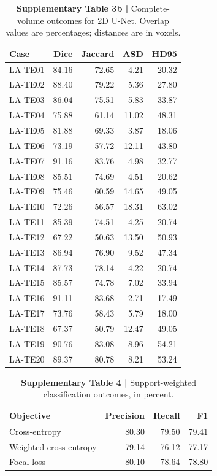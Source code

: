 \documentclass[11pt,a4paper]{article}
\begin{document}
\begin{table}[H]\centering\sffamily\footnotesize
\caption*{\textbf{Supplementary Table 3b | }Complete-volume outcomes for 2D U-Net. Overlap values are percentages; distances are in voxels.}
\setlength{\tabcolsep}{5pt}\renewcommand{\arraystretch}{1.18}
\begin{tabular}{lrrrr}
\toprule
Case & Dice & Jaccard & ASD & HD95 \\
\midrule
LA-TE01 & 84.16 & 72.65 & 4.21 & 20.32 \\
LA-TE02 & 88.40 & 79.22 & 5.36 & 27.80 \\
LA-TE03 & 86.04 & 75.51 & 5.83 & 33.87 \\
LA-TE04 & 75.88 & 61.14 & 11.02 & 48.31 \\
LA-TE05 & 81.88 & 69.33 & 3.87 & 18.06 \\
LA-TE06 & 73.19 & 57.72 & 12.11 & 43.80 \\
LA-TE07 & 91.16 & 83.76 & 4.98 & 32.77 \\
LA-TE08 & 85.51 & 74.69 & 4.51 & 20.62 \\
LA-TE09 & 75.46 & 60.59 & 14.65 & 49.05 \\
LA-TE10 & 72.26 & 56.57 & 18.31 & 63.02 \\
LA-TE11 & 85.39 & 74.51 & 4.25 & 20.74 \\
LA-TE12 & 67.22 & 50.63 & 13.50 & 50.93 \\
LA-TE13 & 86.94 & 76.90 & 9.52 & 47.34 \\
LA-TE14 & 87.73 & 78.14 & 4.22 & 20.74 \\
LA-TE15 & 85.57 & 74.78 & 7.02 & 33.94 \\
LA-TE16 & 91.11 & 83.68 & 2.71 & 17.49 \\
LA-TE17 & 73.76 & 58.43 & 5.79 & 18.00 \\
LA-TE18 & 67.37 & 50.79 & 12.47 & 49.05 \\
LA-TE19 & 90.76 & 83.08 & 8.96 & 54.21 \\
LA-TE20 & 89.37 & 80.78 & 8.21 & 53.24 \\
\bottomrule\end{tabular}\end{table}

\clearpage

\begin{table}[H]\centering\sffamily\footnotesize
\caption*{\textbf{Supplementary Table 4 | }Support-weighted classification outcomes, in percent.}
\setlength{\tabcolsep}{5pt}\renewcommand{\arraystretch}{1.18}
\begin{tabular}{lrrr}
\toprule
Objective & Precision & Recall & F1 \\
\midrule
Cross-entropy & 80.30 & 79.50 & 79.41 \\
Weighted cross-entropy & 79.14 & 76.12 & 77.17 \\
Focal loss & 80.10 & 78.64 & 78.80 \\
\bottomrule\end{tabular}\end{table}
\end{document}
